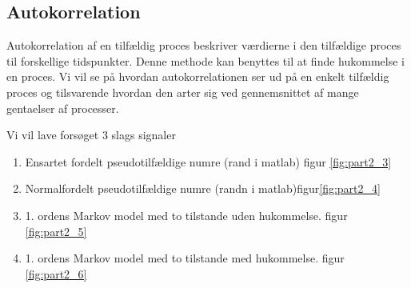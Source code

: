 \subsection{Autokorrelation}
Autokorrelation af en tilfældig proces beskriver værdierne i den tilfældige proces til forskellige tidspunkter. Denne methode kan benyttes til at finde hukommelse i en proces. Vi vil se på hvordan autokorrelationen ser ud på en enkelt tilfældig proces og tilsvarende hvordan den arter sig ved gennemsnittet af mange gentaelser af processer.

Vi vil lave forsøget 3 slags signaler  

\begin{enumerate}
	\item Ensartet fordelt pseudotilfældige numre (rand i matlab)   figur \ref{fig:part2_3}
	\item Normalfordelt pseudotilfældige numre (randn i matlab)figur\ref {fig:part2_4}
	\item 1. ordens Markov model med to tilstande uden hukommelse. figur \ref{fig:part2_5}
	\item 1. ordens Markov model med to tilstande med hukommelse. figur \ref{fig:part2_6} 
\end{enumerate}

